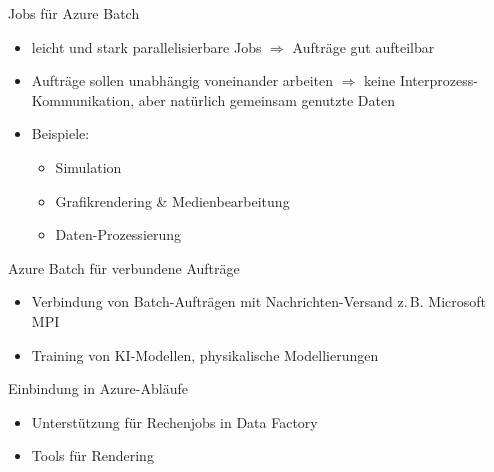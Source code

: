 \begin{flashcard}[]{Jobs für Azure Batch}
  \begin{itemize}
    \item leicht und stark parallelisierbare Jobs\newline
      $\Rightarrow$ Aufträge gut aufteilbar
    \item Aufträge sollen unabhängig voneinander arbeiten\newline
      $\Rightarrow$ keine Interprozess-Kommunikation, aber natürlich gemeinsam genutzte Daten
    \item Beispiele:
      \begin{itemize}
        \item Simulation
        \item Grafikrendering \& Medienbearbeitung
        \item Daten-Prozessierung
      \end{itemize}
  \end{itemize}
\end{flashcard}

\begin{flashcard}[]{Azure Batch für verbundene Aufträge}
  \begin{itemize}
    \item Verbindung von Batch-Aufträgen mit Nachrichten-Versand\newline
      z.\,B. Microsoft MPI
    \item Training von KI-Modellen, physikalische Modellierungen
  \end{itemize}
\end{flashcard}

\begin{flashcard}[]{Einbindung in Azure-Abläufe}
  \begin{itemize}
    \item Unterstützung für Rechenjobs in Data Factory
    \item Tools für Rendering
  \end{itemize}
\end{flashcard}


